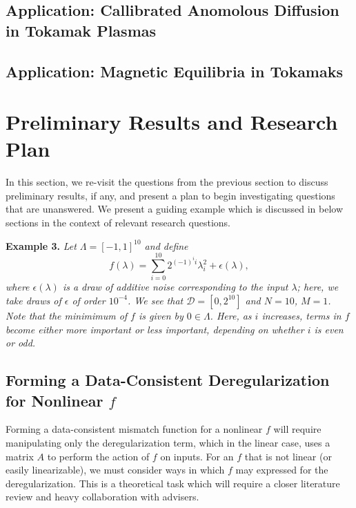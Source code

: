 \documentclass{amsart}
\begin{document}
\subsection{Application: Callibrated Anomolous Diffusion in Tokamak Plasmas}

\subsection{Application: Magnetic Equilibria in Tokamaks}





\section{Preliminary Results and Research Plan}

In this section, we re-visit the questions from the previous section to discuss preliminary results, if any, and present a plan to begin investigating questions that are unanswered. We present a guiding example which is discussed in below sections in the context of relevant research questions.

\vspace{.125cm}

\noindent \textbf{Example 3.} \textit{Let $\Lambda=[-1,1]^{10}$ and define $$f(\lambda)=\sum_{i=0}^{10} 2^{(-1)^i i}\lambda_i^2+\epsilon(\lambda),$$ where $\epsilon(\lambda)$ is a draw of additive noise corresponding to the input $\lambda$; here, we take draws of $\epsilon$ of order $10^{-4}$. We see that $\mathcal{D}=[0,2^{10}]$ and $N=10$, $M=1$. Note that the minimimum of $f$ is given by $0 \in \Lambda$. Here, as $i$ increases, terms in $f$ become either more important or less important, depending on whether $i$ is even or odd.}

\subsection{Forming a Data-Consistent Deregularization for Nonlinear $f$} Forming a data-consistent mismatch function for a nonlinear $f$ will require manipulating only the deregularization term, which in the linear case, uses a matrix $A$ to perform the action of $f$ on inputs. For an $f$ that is not linear (or easily linearizable), we must consider ways in which $f$ may expressed for the deregularization. This is a theoretical task which will require a closer literature review and heavy collaboration with advisers.
\end{document}
